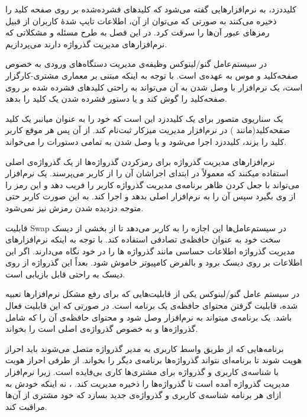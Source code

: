 
کلیددزد، به نرم‌افزارهایی گفته می‌شود که کلیدهای فشرده‌شده بر روی صفحه کلید را ذخیره می‌کنند به صورتی که می‌توان از آن، اطلاعات تایپ شدهٔ کاربران از قبیل رمزهای عبور آن‌ها را سرقت کرد. در این فصل به طرح مسئله و مشکلاتی که نرم‌‌افزارهای مدیریت گذرواژه دارند می‌پردازیم. 


در سیستم‌عامل گنو/لینوکس وظیفه‌ی مدیریت دستگاه‌های ورودی به خصوص صفحه‌کلید و موس به عهده‌ی  است. با توجه به اینکه  مبتنی بر معماری مشتری-کارگزار است، یک نرم‌افزار با وصل شدن به آن می‌تواند به راحتی کلید‌های فشرده شده بر روی صفحه‌کلید را گوش کند و یا دستور فشرده شدن یک کلید را بدهد. 

یک سناریوی متصور برای یک کلیددزد این است که خود را به عنوان میانبر یک کلید صفحه‌کلید(مانند ) در نرم‌افزار مدیریت میزکار ثبت‌نام کند. از آن پس هر موقع کاربر کلید  را بزند، کلیددزد اجرا می‌شود و با وصل شدن به  تمامی دستورات را می‌خواند.


نرم‌افزارهای مدیریت گذرواژه برای رمزکردن گذرواژه‌ها از یک گذرواژه‌ی اصلی استفاده میکنند که معمولاً در ابتدای اجراشان آن را از کاربر می‌پرسند. یک نرم‌افزار می‌تواند با جعل کردن ظاهر برنامه‌ی مدیریت گذرواژه کاربر را فریب دهد و این رمز را از وی بگیرد سپس آن را به نرم‌افزار اصلی بدهد و اجرا کند. به این صورت کاربر حتی متوجه دزدیده شدن رمزش نیز نمی‌شود.


قابلیت Swap در سیستم‌عامل‌ها این اجازه را به کاربر می‌دهد تا از بخشی از دیسک سخت خود به عنوان حافظه‌ی تصادفی استفاده کند. با توجه به اینکه نرم‌افزارهای مدیریت گذرواژه اطلاعات حساسی مانند گذرواژه ها را در خود نگاه می‌دارند. اگر این اطلاعات بر روی دیسک برود و بالفرض کامپیوتر خاموش شود. بعداً این گذرواژه از روی دیسک به راحتی قابل بازیابی است.


در سیستم عامل گنو/لینوکس یکی از قابلیت‌هایی که برای رفع مشکل نرم‌افزارها تعبیه شده، قابلیت گرفتن محتوای حافظه‌ی یک برنامه است. در صورتی که این قابلیت فعال باشد. یک برنامه‌ی  میتواند به نرم‌افزار وصل شود و محتوای حافظه‌ی آن را که شامل گذرواژه‌ها و به خصوص گذرواژه‌ی اصلی است را بخواند.


برنامه‌هایی که از طریق واسط کاربری به مدیر گذرواژه متصل می‌شوند باید احراز هویت شوند تا برنامه‌ای نتواند گذرواژه‌ها برنامه‌ی دیگر را بخواند. از طرفی احراز هویت با شناسه‌ی کاربری و گذرواژه برای مشتری‌ها کاری بی‌فایده است. زیرا نرم‌افزار مدیریت گذرواژه آمده است تا گذرواژه‌ها را ذخیره مدیریت کند. ، نه اینکه خودش به ازای هر برنامه شناسه‌ی کاربری و گذرواژه‌ی جدید بسازد که خود مشتری از آن‌ها مراقبت کند. 
